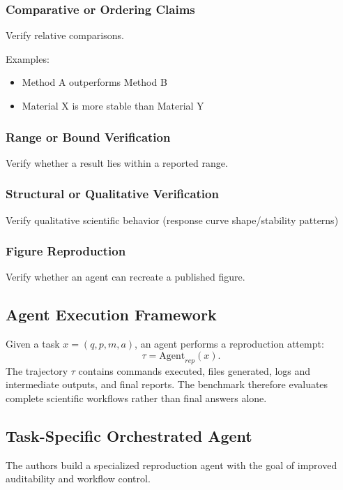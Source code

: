 \documentclass[11pt]{article}
\begin{document}
\subsubsection*{Comparative or Ordering Claims}

Verify relative comparisons.

Examples:

\begin{itemize}
    \item Method A outperforms Method B
    \item Material X is more stable than Material Y
\end{itemize}

\subsubsection*{Range or Bound Verification}

Verify whether a result lies within a reported range.

\subsubsection*{Structural or Qualitative Verification}

Verify qualitative scientific behavior (response curve shape/stability patterns)

\subsubsection*{Figure Reproduction}

Verify whether an agent can recreate a published figure.

\subsection*{Agent Execution Framework}

Given a task $x=(q,p,m,a)$, an agent performs a reproduction attempt:
\[\tau=\text{Agent}_{rep}(x).\]
The trajectory $\tau$ contains commands executed, files generated, logs and intermediate outputs, and final reports.
The benchmark therefore evaluates complete scientific workflows rather than final answers alone.

\subsection*{Task-Specific Orchestrated Agent}

The authors build a specialized reproduction agent with the goal of improved auditability and workflow control.
\end{document}
